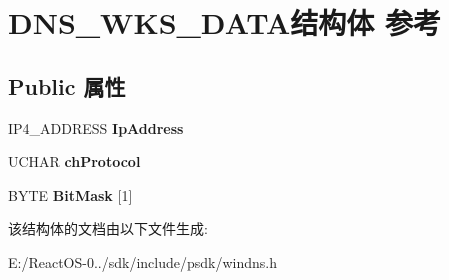 \hypertarget{struct_d_n_s___w_k_s___d_a_t_a}{}\section{D\+N\+S\+\_\+\+W\+K\+S\+\_\+\+D\+A\+T\+A结构体 参考}
\label{struct_d_n_s___w_k_s___d_a_t_a}
\subsection*{Public 属性}
\begin{DoxyCompactItemize}
\item 
\mbox{\label{struct_d_n_s___w_k_s___d_a_t_a_a93cc738e347583c40963782a2431c1e7}} 
I\+P4\+\_\+\+A\+D\+D\+R\+E\+SS {\bfseries Ip\+Address}
\item 
\mbox{\label{struct_d_n_s___w_k_s___d_a_t_a_a30fd996b2126de136a25d40d7f096b90}} 
U\+C\+H\+AR {\bfseries ch\+Protocol}
\item 
\mbox{\label{struct_d_n_s___w_k_s___d_a_t_a_abfc250987dcbc9140b97ce499f8bc97a}} 
B\+Y\+TE {\bfseries Bit\+Mask} \mbox{[}1\mbox{]}
\end{DoxyCompactItemize}


该结构体的文档由以下文件生成\+:\begin{DoxyCompactItemize}
\item 
E\+:/\+React\+O\+S-\/0../sdk/include/psdk/windns.\+h\end{DoxyCompactItemize}
